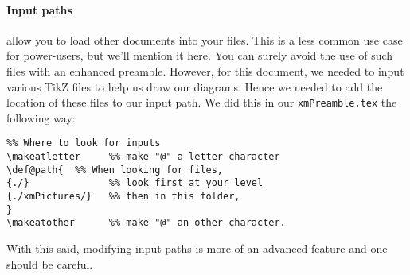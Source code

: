 \documentclass{ximera}
\begin{document}
\paragraph{Input paths} allow you to load other documents into your files.
This is a less common use case for power-users, but we'll mention it here. You can surely avoid
the use of such files with an enhanced preamble. However, for this document, we
needed to input various TikZ files to help us draw our diagrams. Hence we
needed to
add the location of these files to our input path. We did this in our \verb!xmPreamble.tex!
the following way:
\begin{verbatim}
%% Where to look for inputs
\makeatletter     %% make "@" a letter-character
\def@path{  %% When looking for files,
{./}              %% look first at your level
{./xmPictures/}   %% then in this folder,
}
\makeatother      %% make "@" an other-character.
\end{verbatim}
With this said, modifying input paths is more of an advanced feature and one
should be careful.
\end{document}
